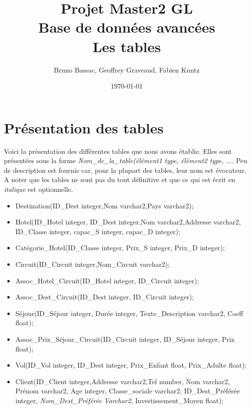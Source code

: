 \documentclass[10pt]{article}
\author{Bruno Bassac, Geoffrey Graveaud, Fabien Kuntz}
\title{\textbf{Projet Master2 GL} \\
\textbf{Base de données avancées} \\
Les tables}
\date{\today}
\begin{document}
\maketitle

\section{Présentation des tables}
Voici la présentation des différentes tables que nous avons établie. Elles sont présentées sous la forme \textit{Nom\_de\_la\_table(élément1 type, élément2 type, $\dots$}. Peu de description est fournie car, pour la plupart des tables, leur nom est évocateur. A noter que les tables ne sont pas du tout définitive et que ce qui est écrit en \textit{italique} est optionnelle.\bigskip

\begin{itemize}
\item Destination(ID\_Dest integer,Nom varchar2,Pays varchar2);\\
\item Hotel(ID\_Hotel integer, ID\_Dest integer,Nom varchar2,Addresse varchar2, ID\_Classe integer, capac\_S integer, capac\_D integer);\\
\item Catégorie\_Hotel(ID\_Classe integer, Prix\_S integer, Prix\_D integer);\\
\item Circuit(ID\_Circuit integer,Nom\_Circuit varchar2);\\
\item Assoc\_Hotel\_Circuit(ID\_Hotel integer, ID\_Circuit integer);\\
\item Assoc\_Dest\_Circuit(ID\_Dest integer, ID\_Circuit integer);\\
\item Séjour(ID\_Séjour integer, Durée integer, Texte\_Description varchar2, Coeff float);\\
\item Assoc\_Prix\_Séjour\_Circuit(ID\_Circuit integer, ID\_Séjour integer, Prix float);\\
\item Vol(ID\_Vol integer, ID\_Dest integer, Prix\_Enfant float, Prix\_Adulte float);\\
\item Client(ID\_Client integer,Addresse varchar2,Tel number, Nom varchar2, Prénom varchar2, Age integer, Classe\_sociale varchar2, ID\_Dest\_Préférée integer, \textit{Nom\_Dest\_Préférée Varchar2}, Investissement\_Moyen float);\\

\end{itemize}
\end{document}
